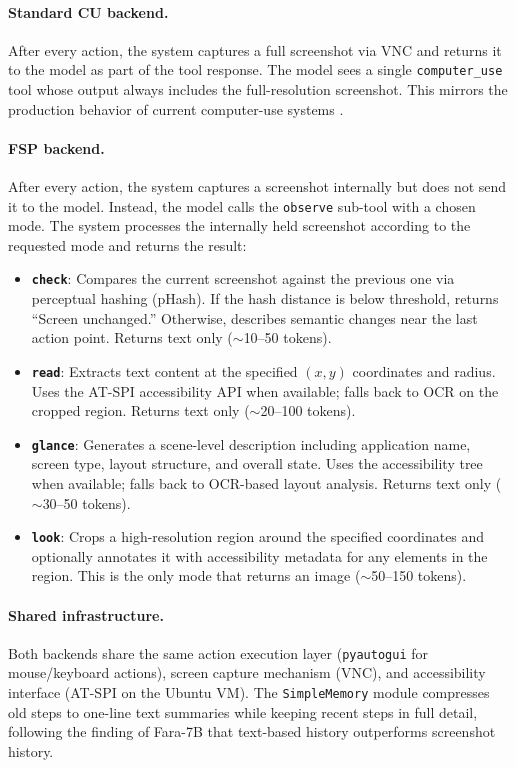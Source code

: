 \documentclass[11pt,a4paper]{article}
\begin{document}
\paragraph{Standard CU backend.}
After every action, the system captures a full screenshot via VNC and returns it to the model as part of the tool response. The model sees a single \texttt{computer\_use} tool whose output always includes the full-resolution screenshot. This mirrors the production behavior of current computer-use systems \cite{claude-computer-use, openai-operator}.

\paragraph{FSP backend.}
After every action, the system captures a screenshot internally but does not send it to the model. Instead, the model calls the \texttt{observe} sub-tool with a chosen mode. The system processes the internally held screenshot according to the requested mode and returns the result:

\begin{itemize}
    \item \textbf{\texttt{check}}: Compares the current screenshot against the previous one via perceptual hashing (pHash). If the hash distance is below threshold, returns ``Screen unchanged.'' Otherwise, describes semantic changes near the last action point. Returns text only ($\sim$10--50 tokens).
    \item \textbf{\texttt{read}}: Extracts text content at the specified $(x, y)$ coordinates and radius. Uses the AT-SPI accessibility API when available; falls back to OCR on the cropped region. Returns text only ($\sim$20--100 tokens).
    \item \textbf{\texttt{glance}}: Generates a scene-level description including application name, screen type, layout structure, and overall state. Uses the accessibility tree when available; falls back to OCR-based layout analysis. Returns text only ($\sim$30--50 tokens).
    \item \textbf{\texttt{look}}: Crops a high-resolution region around the specified coordinates and optionally annotates it with accessibility metadata for any elements in the region. This is the only mode that returns an image ($\sim$50--150 tokens).
\end{itemize}

\paragraph{Shared infrastructure.}
Both backends share the same action execution layer (\texttt{pyautogui} for mouse/keyboard actions), screen capture mechanism (VNC), and accessibility interface (AT-SPI on the Ubuntu VM). The \texttt{SimpleMemory} module compresses old steps to one-line text summaries while keeping recent steps in full detail, following the finding of Fara-7B \cite{fara-7b} that text-based history outperforms screenshot history.
\end{document}
